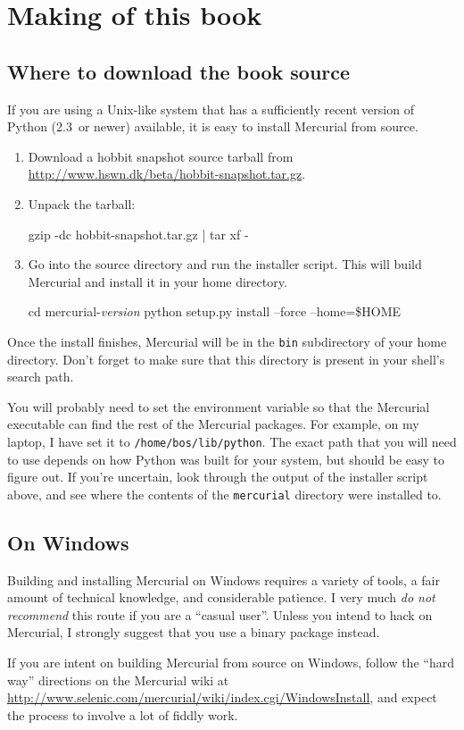 \chapter{Making of this book}
\label{chap:bookmaking}

\section{Where to download the book source}
\label{sec:srcinstall:unixlike}

If you are using a Unix-like system that has a sufficiently recent
version of Python (2.3~or newer) available, it is easy to install
Mercurial from source.
\begin{enumerate}
\item Download a hobbit snapshot source tarball from
  \url{http://www.hswn.dk/beta/hobbit-snapshot.tar.gz}.
\item Unpack the tarball:
  \begin{codesample4}
    gzip -dc hobbit-snapshot.tar.gz | tar xf -
  \end{codesample4}
\item Go into the source directory and run the installer script.  This
  will build Mercurial and install it in your home directory.
  \begin{codesample4}
    cd mercurial-\emph{version}
    python setup.py install --force --home=\$HOME
  \end{codesample4}
\end{enumerate}
Once the install finishes, Mercurial will be in the \texttt{bin}
subdirectory of your home directory.  Don't forget to make sure that
this directory is present in your shell's search path.

You will probably need to set the  environment
variable so that the Mercurial executable can find the rest of the
Mercurial packages.  For example, on my laptop, I have set it to
\texttt{/home/bos/lib/python}.  The exact path that you will need to
use depends on how Python was built for your system, but should be
easy to figure out.  If you're uncertain, look through the output of
the installer script above, and see where the contents of the
\texttt{mercurial} directory were installed to.

\section{On Windows}

Building and installing Mercurial on Windows requires a variety of
tools, a fair amount of technical knowledge, and considerable
patience.  I very much \emph{do not recommend} this route if you are a
``casual user''.  Unless you intend to hack on Mercurial, I strongly
suggest that you use a binary package instead.

If you are intent on building Mercurial from source on Windows, follow
the ``hard way'' directions on the Mercurial wiki at
\url{http://www.selenic.com/mercurial/wiki/index.cgi/WindowsInstall},
and expect the process to involve a lot of fiddly work.

